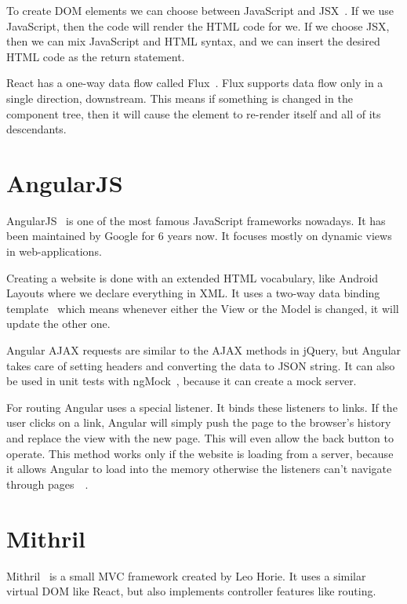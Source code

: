 To create DOM elements we can choose between JavaScript and JSX~\cite{JSX}. If we use JavaScript, then the code will render the HTML code for we. If we choose JSX, then we can mix JavaScript and HTML syntax, and we can insert the desired HTML code as the return statement. 

React has a one-way data flow called Flux~\cite{Flux}. Flux supports data flow only in a single direction, downstream. This means if something is changed in the component tree, then it will cause the element to re-render itself and all of its descendants.

\section{AngularJS}

AngularJS~\cite{Angular} is one of the most famous JavaScript frameworks nowadays.  It has been maintained by Google for 6 years now. It focuses mostly on dynamic views in web-applications. 

Creating a website is done with an extended HTML vocabulary, like Android Layouts where we declare everything in XML.  It uses a two-way data binding template~\cite{Angular-Developer-DataBinding} which means whenever either the View or the Model is changed, it will update the other one.

Angular AJAX requests are similar to the AJAX methods in jQuery, but Angular takes care of setting headers and converting the data to JSON string. It can also be used in unit tests with ngMock~\cite{Angular-AJAX}, because it can create a mock server. 

For routing Angular uses a special listener. It binds these listeners to links. If the user clicks on a link, Angular will simply push the page to the browser's history and replace the view with the new page. This will even allow the back button to operate. This method works only if the website is loading from a server, because it allows Angular to load into the memory otherwise the listeners can't navigate through pages~\cite{Angular-Location}~\cite{Angular-Location2}.


\section{Mithril}

Mithril~\cite{Mithril} is a small MVC framework created by Leo Horie. It uses a similar virtual DOM like React, but also implements controller features like routing.

